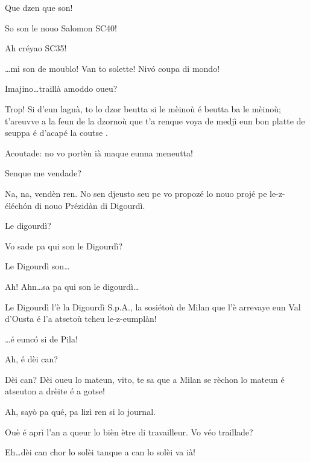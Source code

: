 \begin{drama}
\Joellespeaks Que dzen que son!

\Jeanspeaks {} So son le nouo Salomon SC40!

\Dallasspeaks {} Ah créyao SC35!

\Jeanspeaks {} \ldots mi son de moublo! Van to solette! Niv\'o coupa di mondo! 

\Dallasspeaks Imajino\ldots traillà amoddo oueu?

\Jeanspeaks {} Trop! Si d'eun lagnà, to lo dzor beutta si le mèinoù é beutta ba le mèinoù; t'areuvve a la feun de la dzornoù que t'a renque voya de medjì eun bon platte de seuppa é d'acapé la coutse  . 

\Dallasspeaks Acoutade: no vo portèn ià maque eunna meneutta!

\Jeanspeaks Senque me vendade?

\Joellespeaks Na, na, vendèn ren. No sen djeusto seu pe vo propozé lo nouo projé pe le-z-éléch\'on di nouo Prézidàn di Digourdì.

\Jeanspeaks Le digourdì?

\Dallasspeaks Vo sade pa qui son le Digourdì?


\Joellespeaks Le Digourdì son\ldots


\Dallasspeaks Ah! Ahn\ldots sa pa qui son le digourdì\ldots


\Dallasspeaks Le Digourdì l'è la Digourdì S.p.A., la sosiétoù de Milan que l'è arrevaye eun Val d'Ousta é l'a atsetoù tcheu le-z-eumplàn!

\Joellespeaks \ldots é eunc\'o si de Pila!

\Jeanspeaks Ah, é dèi can?

\Dallasspeaks Dèi can? Dèi oueu lo mateun, vito, te sa que a Milan se rèchon lo mateun é atseuton a drèite é a gotse!

\Jeanspeaks Ah, sayò pa qué, pa lizì ren si lo journal.

\Joellespeaks Ouè é aprì l'an a queur lo bièn ètre di travailleur. Vo véo traillade?

\Jeanspeaks  Eh\ldots dèi can chor lo solèi tanque a can lo solèi va ià!


\end{drama}
